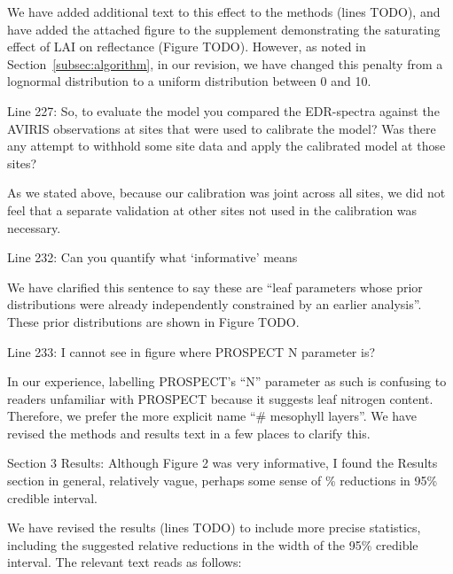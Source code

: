 We have added additional text to this effect to the methods (lines TODO), and have added the attached figure to the supplement demonstrating the saturating effect of LAI on reflectance (Figure TODO).
However, as noted in Section~\ref{subsec:algorithm}, in our revision, we have changed this penalty from a lognormal distribution to a uniform distribution between 0 and 10.

\begin{reviewer}
  Line 227: So, to evaluate the model you compared the EDR-spectra against the AVIRIS observations at sites that were used to calibrate the model? Was there any attempt to withhold some site data and apply the calibrated model at those sites?
\end{reviewer}

As we stated above, because our calibration was joint across all sites, we did not feel that a separate validation at other sites not used in the calibration was necessary.

\begin{reviewer}
  Line 232: Can you quantify what ‘informative’ means
\end{reviewer}

We have clarified this sentence to say these are ``leaf parameters whose prior distributions were already independently constrained by an earlier analysis''. These prior distributions are shown in Figure TODO.

\begin{reviewer}
  Line 233: I cannot see in figure where PROSPECT N parameter is?
\end{reviewer}

In our experience, labelling PROSPECT’s ``N'' parameter as such is confusing to readers unfamiliar with PROSPECT because it suggests leaf nitrogen content.
Therefore, we prefer the more explicit name ``\# mesophyll layers''.
We have revised the methods and results text in a few places to clarify this.

\begin{reviewer}
  Section 3 Results: Although Figure 2 was very informative, I found the Results section in general, relatively vague, perhaps some sense of \% reductions in 95\% credible interval.
\end{reviewer}

We have revised the results (lines TODO) to include more precise statistics, including the suggested relative reductions in the width of the 95\% credible interval.
The relevant text reads as follows:

